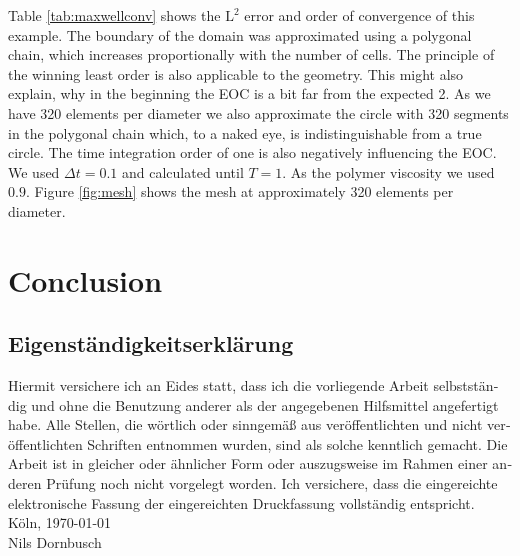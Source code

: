 \documentclass[12pt,a4paper,twoside, open=right]{scrreprt}
\theoremstyle{definition}
\theoremstyle{plain}
\begin{document}
Table \ref{tab:maxwellconv} shows the $\mathrm{L}^2$ error and order of convergence of this example. The boundary of the domain was approximated using a polygonal chain, which increases proportionally with the number of cells. The principle of the winning least order is also applicable to the geometry. This might also explain, why in the beginning the EOC is a bit far from the expected 2. As we have 320 elements per diameter we also approximate the circle with 320 segments in the polygonal chain which, to a naked eye, is indistinguishable from a true circle. The time integration order of one is also negatively influencing the EOC. We used $\Delta t = 0.1$ and calculated until $T=1$. As the polymer viscosity we used $0.9$. Figure \ref{fig:mesh} shows the mesh at approximately 320 elements per diameter.
\chapter{Conclusion}

\setcounter{lofdepth}{2}
\listoffigures
\newpage
{}

{}
\newpage
\begin{otherlanguage}{ngerman}
\chapter*{Eigenständigkeitserklärung}
Hiermit versichere ich an Eides statt, dass ich die vorliegende Arbeit selbstständig und ohne die Benutzung anderer als der angegebenen  Hilfsmittel  angefertigt  habe.  
Alle  Stellen,  die  wörtlich  oder  sinngemäß  aus  veröffentlichten  und  nicht  veröffentlichten  Schriften  entnommen  wurden,  sind  als  solche  kenntlich  gemacht.  
Die  Arbeit  ist  in  gleicher  oder  ähnlicher  Form  oder  auszugsweise  im  Rahmen  einer  anderen  Prüfung  noch  nicht  vorgelegt  worden. 
Ich  versichere,  dass  die  eingereichte    elektronische    Fassung    der    eingereichten    Druckfassung    vollständig    entspricht.
\\[\bigskipamount]
Köln, \today
\\[2\bigskipamount]
Nils Dornbusch
\end{otherlanguage}
\end{document}
